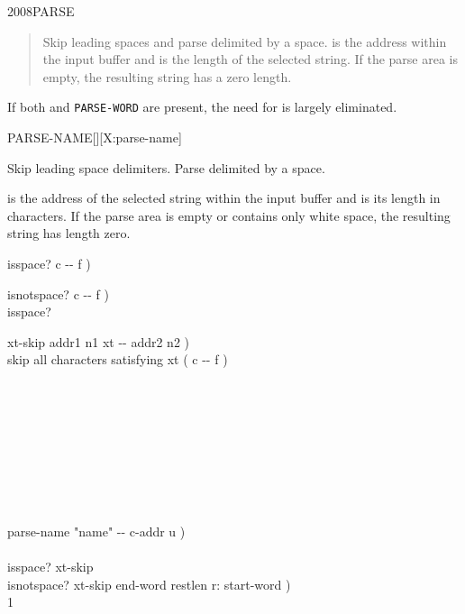 \begin{worddef}{2008}{PARSE}
\begin{rationale}
\begin{enumerate}
\begin{quote}
				Skip leading spaces and parse  delimited by
				a space.  is the address within the input
				buffer and  is the length of the selected string.
				If the parse area is empty, the resulting string has a
				zero length.
			\end{quote}

			If both  and \texttt{PARSE-WORD} are present,
			the need for  is largely eliminated.
		\end{enumerate}
	\end{rationale}
\end{worddef}


\begin{worddef}{}{PARSE-NAME}[][X:parse-name]
\item {}

	Skip leading space delimiters. Parse  delimited by a
	space.

	 is the address of the selected string within the
	input buffer and  is its length in characters. If the
	parse area is empty or contains only white space, the resulting
	string has length zero.

	\begin{implement} %
		\word{:} isspace?  c -{}- f ) \\
		\tab {}   \word{;}

		\word{:} isnotspace?  c -{}- f ) \\
		\tab isspace?  \word{;}

		\word{:} xt-skip  addr1 n1 xt -{}- addr2 n2 ) \\
		\tab {} skip all characters satisfying xt ( c -{}- f ) \\
		\tab {} \\
		\tab {} \\
		\tab[2]  \\
		\tab {} \\
		\tab[2]     \\
		\tab {} \\
		  \\
		\tab {}  \\
		\tab {}  \word{;}

		\word{:} parse-name  "name" -{}- c-addr u ) \\
		\tab {}    \\
		\tab \word{[']} isspace? xt-skip   \\
		\tab \word{[']} isnotspace? xt-skip  end-word restlen r: start-word ) \\
		\tab {} 1  \word{+}   \word{-}  \word{!} \\
		\tab {}   \word{-} \word{;}
	\end{implement}


\end{worddef}
